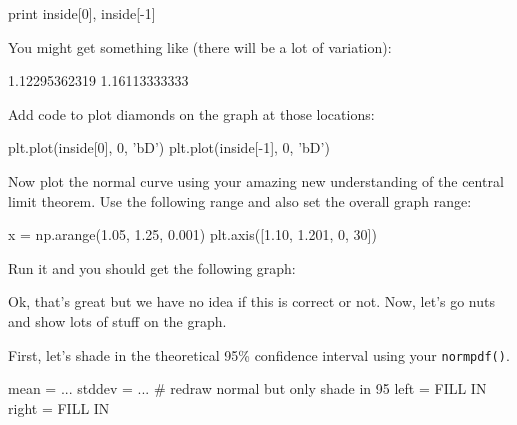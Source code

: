 \begin{fullwidth}
\begin{pyverbatim}
print inside[0], inside[-1]
\end{pyverbatim}

\noindent You might get something like (there will be a lot of variation):

1.12295362319 1.16113333333

\step Add code to plot diamonds on the graph at those locations:

\begin{pyverbatim}
plt.plot(inside[0], 0, 'bD')
plt.plot(inside[-1], 0, 'bD')
\end{pyverbatim}

\step Now plot the normal curve using your amazing new understanding of the central limit  theorem. Use the following range and also set the overall graph range:

\begin{pyverbatim}
x = np.arange(1.05, 1.25, 0.001)
plt.axis([1.10, 1.201, 0, 30])
\end{pyverbatim}

\step Run it and you should get the following graph:


Ok, that's great but we have no idea if this is correct or not. Now, let's go nuts and show lots of stuff on the graph.

\step First, let's shade in the theoretical 95\% confidence interval using your {\tt normpdf()}.

\begin{pyverbatim}
mean = ...
stddev = ...
# redraw normal but only shade in 95%
left  = FILL IN
right = FILL IN


\end{pyverbatim}
\end{fullwidth}
